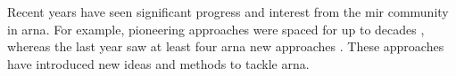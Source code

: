 

Recent years have seen significant progress and interest
from the \gls{mir} community in \gls{arna}. For example,
pioneering approaches were spaced for up to decades
\parencite{winograd1968linguistics, maxwell1984artificial,
temperley1997algorithm}, whereas the last year saw at least
four \gls{arna} new approaches \parencite{chen2021attend,
micchi2021deep, mcleod2021modular,
napoleslopez2021augmentednet}. These approaches have
introduced new ideas and methods to tackle \gls{arna}.
